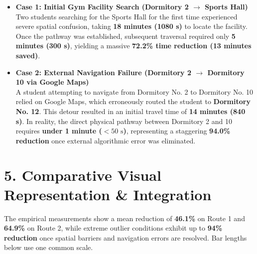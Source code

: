 \documentclass[11pt, a4paper]{article}
\begin{document}
\begin{tcolorbox}[colframe=accent, title=Detailed Case Breakdown: Extreme Outliers]
\begin{itemize}
    \item \textbf{Case 1: Initial Gym Facility Search (Dormitory 2 $\rightarrow$ Sports Hall)} \\
    Two students searching for the Sports Hall for the first time experienced severe spatial confusion, taking \textbf{18 minutes (1080 s)} to locate the facility. Once the pathway was established, subsequent traversal required only \textbf{5 minutes (300 s)}, yielding a massive \textbf{72.2\% time reduction (13 minutes saved)}.
    \item \textbf{Case 2: External Navigation Failure (Dormitory 2 $\rightarrow$ Dormitory 10 via Google Maps)} \\
    A student attempting to navigate from Dormitory No. 2 to Dormitory No. 10 relied on Google Maps, which erroneously routed the student to \textbf{Dormitory No. 12}. This detour resulted in an initial travel time of \textbf{14 minutes (840 s)}. In reality, the direct physical pathway between Dormitory 2 and 10 requires \textbf{under 1 minute ($<50\text{ s}$)}, representing a staggering \textbf{94.0\% reduction} once external algorithmic error was eliminated.
\end{itemize}
\end{tcolorbox}

\vspace{1em}


\newpage
\section*{5. Comparative Visual Representation \& Integration}

The empirical measurements show a mean reduction of \textbf{46.1\%} on Route 1 and \textbf{64.9\%} on Route 2, while extreme outlier conditions exhibit up to \textbf{94\% reduction} once spatial barriers and navigation errors are resolved. Bar lengths below use one common scale.

\vspace{0.8em}
\end{document}
